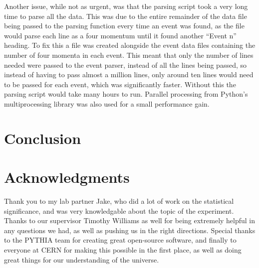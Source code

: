 \documentclass[11pt]{amsart}
\begin{document}
\begin{multicols}{2}
Another issue, while not as urgent, was that the parsing script took a very long time to parse all the data. This was due to the entire remainder of the data file being passed to the parsing function every time an event was found, as the file would parse each line as a four momentum until it found another ``Event n'' heading. To fix this a file was created alongside the event data files containing the number of four momenta in each event. This meant that only the number of lines needed were passed to the event parser, instead of all the lines being passed, so instead of having to pass almost a million lines, only around ten lines would need to be passed for each event, which was significantly faster. Without this the parsing script would take many hours to run. Parallel processing from Python's multiprocessing library was also used for a small performance gain.

\section{Conclusion}

\section{Acknowledgments}

Thank you to my lab partner Jake, who did a lot of work on the statistical significance, and was very knowledgable about the topic of the experiment. Thanks to our supervisor Timothy Williams as well for being extremely helpful in any questions we had, as well as pushing us in the right directions. Special thanks to the PYTHIA team for creating great open-source software, and finally to everyone at CERN for making this possible in the first place, as well as doing great things for our understanding of the universe.


\end{multicols}



\end{document}
